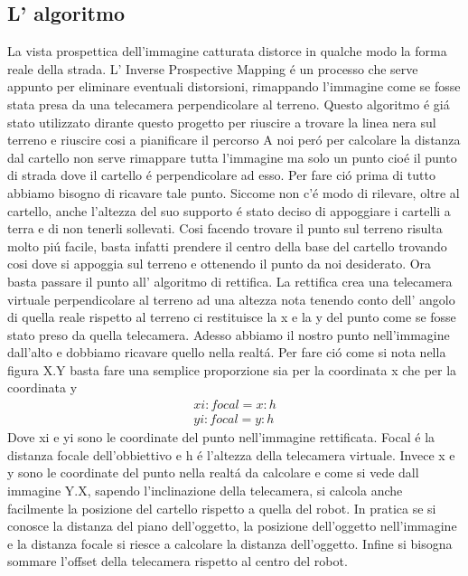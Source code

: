 	\subsection{L' algoritmo}

		La vista prospettica dell'immagine catturata distorce in qualche modo la forma reale della strada. L' Inverse Prospective Mapping \'e un processo che serve appunto per eliminare eventuali distorsioni, rimappando l'immagine come se fosse stata presa da una telecamera perpendicolare al terreno. Questo algoritmo \'e gi\'a stato utilizzato dirante questo progetto per riuscire a trovare la linea nera sul terreno e riuscire cosi a pianificare il percorso \cite{Rettifica}\newline 
		A noi per\'o per calcolare la distanza dal cartello non serve rimappare tutta l'immagine ma solo un punto cio\'e il punto di strada dove il cartello \'e perpendicolare ad esso. Per fare ci\'o prima di tutto abbiamo bisogno di ricavare tale punto. Siccome non c'\'e modo di rilevare, oltre al cartello, anche l'altezza del suo supporto \'e stato deciso di appoggiare i cartelli a terra e di non tenerli sollevati. Cosi facendo trovare il punto sul terreno risulta molto pi\'u facile, basta infatti prendere il centro della base del cartello trovando cosi dove si appoggia sul terreno e ottenendo il punto da noi desiderato.\newline
		Ora basta passare il punto all' algoritmo di rettifica. La rettifica crea una telecamera virtuale perpendicolare al terreno ad una altezza nota tenendo conto dell' angolo di quella reale  rispetto al terreno ci restituisce la x e la y del punto come se fosse stato preso da quella telecamera.\newline
		Adesso abbiamo il nostro punto nell'immagine dall'alto e dobbiamo ricavare quello nella realt\'a. Per fare ci\'o come si nota nella figura X.Y basta fare una semplice proporzione sia per la coordinata x che per la coordinata y
		\begin{align*}
			xi : focal = x : h
			\\
			yi : focal = y : h
		\end{align*}
		Dove xi e yi sono le coordinate del punto nell'immagine rettificata. Focal \'e la distanza focale dell'obbiettivo e h \'e l'altezza della telecamera virtuale. Invece x e y sono le coordinate del punto nella realt\'a da calcolare e come si vede dall immagine Y.X, sapendo l'inclinazione della telecamera, si calcola anche facilmente la posizione del cartello rispetto a quella del robot.
		In pratica se si conosce la distanza del piano dell'oggetto, la posizione dell'oggetto nell'immagine e la distanza focale si riesce a calcolare la distanza dell'oggetto. Infine si bisogna sommare l'offset della telecamera rispetto al centro del robot.

